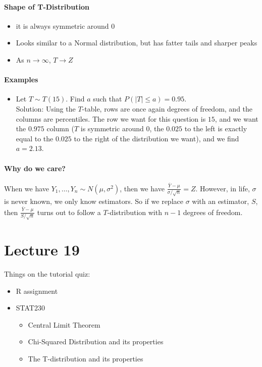 \documentclass[10pt,letter]{article}
\theoremstyle{plain}
\theoremstyle{definition}
\begin{document}
\paragraph{Shape of T-Distribution}
\begin{itemize}
    \item it is always symmetric around $0$ 
    \item Looks similar to a Normal distribution, but has fatter tails and sharper peaks 
    \item As $n\rightarrow\infty$, $T\rightarrow Z$ 
\end{itemize}

\paragraph{Examples}
\begin{itemize}
    \item Let $T\sim T(15)$. Find $a$ such that $P(|T|\leq a)=0.95$. \\ 
    Solution: Using the $T$-table, rows are once again degrees of freedom, and the columns are percentiles. The row we want for this question is $15$, and we want the $0.975$ column ($T$ is symmetric around $0$, the $0.025$ to the left is exactly equal to the $0.025$ to the right of the distribution we want), and we find $a=2.13$.
\end{itemize}

\paragraph{Why do we care?}
When we have $Y_1,\ldots,Y_n\sim N(\mu,\sigma^2)$, then we have $\frac{\bar{Y}-\mu}{\sigma/\sqrt{n}}=Z$. However, in life, $\sigma$ is never known, we only know estimators. So if we replace $\sigma$ with an estimator, $S$, then $\frac{\bar{Y}-\mu}{S/\sqrt{n}}$ turns out to follow a $T$-distribution with $n-1$ degrees of freedom. 

\section*{Lecture 19}
Things on the tutorial quiz:
\begin{itemize}
    \item R assignment 
    \item STAT230
    \begin{itemize}
        \item Central Limit Theorem 
        \item Chi-Squared Distribution and its properties
        \item The T-distribution and its properties
    \end{itemize}
\end{itemize}
\end{document}

